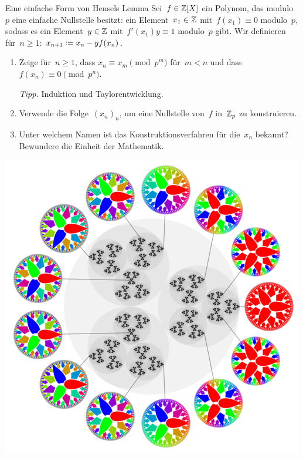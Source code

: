 \documentclass{uebblatt}
\begin{document}
\begin{aufgabe}{Eine einfache Form von Hensels Lemma}
Sei~$f \in \mathbb{Z}[X]$ ein
Polynom, das modulo~$p$ eine einfache Nullstelle besitzt: ein Element~$x_1
\in \mathbb{Z}$ mit~$f(x_1) \equiv 0$ modulo~$p$, sodass es ein Element~$y \in \mathbb{Z}$
mit~$f'(x_1) y \equiv 1$ modulo~$p$ gibt.
Wir definieren für~$n \geq 1$: $x_{n+1} \vcentcolon= x_n - y f(x_n)$.
\begin{enumerate}
\item Zeige für~$n \geq 1$, dass $x_n \equiv x_m \pmod{p^m}$ für~$m < n$ und dass~$f(x_n) \equiv 0 \pmod{p^n}$.

{\tiny\emph{Tipp.} Induktion und Taylorentwicklung.\par}
\item Verwende die Folge~$(x_n)_n$, um eine Nullstelle von~$f$ in~$\mathbb{Z}_p$ zu
konstruieren.
\item Unter welchem Namen ist das Konstruktionsverfahren für die~$x_n$ bekannt?
Bewundere die Einheit der Mathematik.
\end{enumerate}
\end{aufgabe}

{\centering\href{https://en.wikipedia.org/wiki/P-adic_number}{\includegraphics[scale=0.24]{images/p-adic-numbers}}\par}
\end{document}
